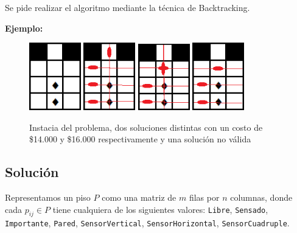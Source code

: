\documentclass[a4paper, 10pt, twoside]{article}
\begin{document}
Se pide realizar el algoritmo mediante la técnica de Backtracking.

\textbf{Ejemplo:}
\begin{figure}[H]
  \centering
\includegraphics[width=0.20\textwidth]{ejemplo_problema3/grilla.png}
\includegraphics[width=0.20\textwidth]{ejemplo_problema3/grilla-sol16000.png}
\includegraphics[width=0.20\textwidth]{ejemplo_problema3/grilla-sol14000.png}
\includegraphics[width=0.20\textwidth]{ejemplo_problema3/grillaSinSol.png}
  \caption{Instacia del problema, dos soluciones distintas con un costo de \$14.000 y \$16.000 respectivamente y una solución no válida} 
  \label{fig:1}
\end{figure}


\subsection{Solución}

Representamos un piso $P$ como una matriz de $m$ filas por $n$ columnas, donde cada $p_{ij} \in P$ tiene cualquiera de los siguientes valores: \texttt{Libre}, \texttt{Sensado}, \texttt{Importante}, \texttt{Pared}, \texttt{SensorVertical}, \texttt{SensorHorizontal}, \texttt{SensorCuadruple}.
\end{document}
